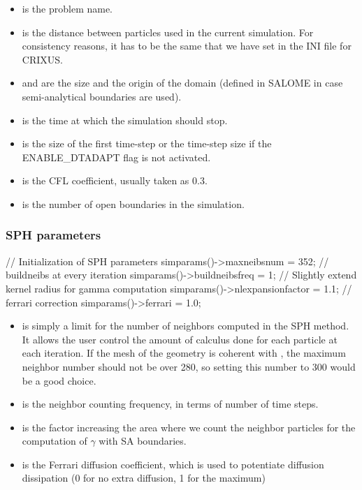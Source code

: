 \documentclass{../GPUSPHtemplate}
\begin{document}
\begin{itemize}
\item {} is the problem name.

\item {} is the distance between particles used in the current simulation. 
For consistency reasons, it has to be the same that we have set in the INI file for CRIXUS.

\item {} and  are the size and the origin of the domain 
(defined in SALOME in case semi-analytical boundaries are used).

\item {} is the time at which the simulation should stop.

\item {} is the size of the first time-step or the time-step size if the ENABLE\_DTADAPT
flag is not activated.

\item {} is the CFL coefficient, usually taken as 0.3.

\item {} is the number of open boundaries in the simulation.
\end{itemize}

\subsubsection{SPH parameters}
\begin{ccode}
// Initialization of SPH parameters
simparams()->maxneibsnum = 352;
// buildneibs at every iteration
simparams()->buildneibsfreq = 1;
// Slightly extend kernel radius for gamma computation
simparams()->nlexpansionfactor = 1.1;
// ferrari correction
simparams()->ferrari = 1.0;
\end{ccode}
\begin{itemize}
\item {} is simply a limit for the number of neighbors computed 
in the SPH method. It allows the user control the amount of calculus 
done for each particle at each iteration. If the mesh of the geometry 
is coherent with , the maximum neighbor number should not be over 280, 
so setting this number to 300 would be a good choice.
\item {} is the neighbor counting frequency, 
in terms of number of time steps.
\item {} is the factor increasing the area 
where we count the neighbor particles
for the computation of $\gamma$ with SA boundaries.
\item {} is the Ferrari diffusion coefficient, which is used 
to potentiate diffusion dissipation (0 for no extra diffusion, 1 for the maximum)
\end{itemize}
\end{document}
